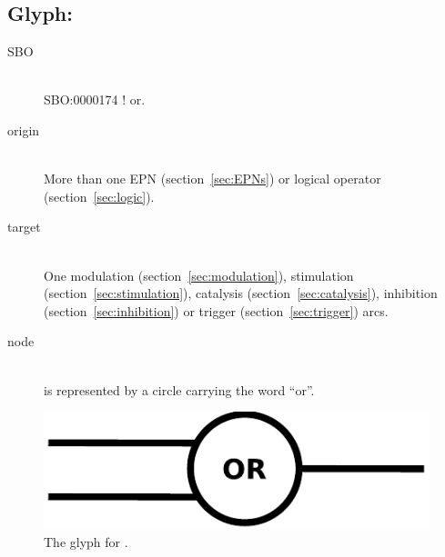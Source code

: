 \subsection{Glyph: }\label{sec:or}

\begin{description}
 \item[SBO]\mbox{}\\ SBO:0000174 ! or.
 \item[origin]\mbox{}\\ More than one EPN (section~\ref{sec:EPNs}) or logical operator (section~\ref{sec:logic}).
 \item[target]\mbox{}\\  One modulation (section~\ref{sec:modulation}), stimulation (section~\ref{sec:stimulation}), catalysis (section~\ref{sec:catalysis}), inhibition (section~\ref{sec:inhibition}) or trigger (section~\ref{sec:trigger}) arcs.
 \item[node]\mbox{}\\  is represented by a circle carrying the word ``or''.
 \end{description}

\begin{figure}[H]
  \centering
  \includegraphics[scale = 0.5]{images/or}
  \caption{The \PD glyph for .}
  \label{fig:or}
\end{figure}


